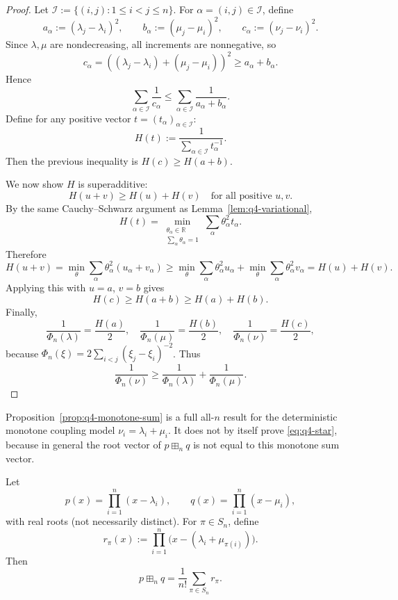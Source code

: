 \begin{proof}
Let $\mathcal I:=\{(i,j):1\le i<j\le n\}$. For $\alpha=(i,j)\in\mathcal I$, define
\[
a_\alpha:=(\lambda_j-\lambda_i)^2,\qquad
b_\alpha:=(\mu_j-\mu_i)^2,\qquad
c_\alpha:=(\nu_j-\nu_i)^2.
\]
Since $\lambda,\mu$ are nondecreasing, all increments are nonnegative, so
\[
c_\alpha=( (\lambda_j-\lambda_i)+(\mu_j-\mu_i) )^2\ge a_\alpha+b_\alpha.
\]
Hence
\[
\sum_{\alpha\in\mathcal I}\frac1{c_\alpha}\le \sum_{\alpha\in\mathcal I}\frac1{a_\alpha+b_\alpha}.
\]
Define for any positive vector $t=(t_\alpha)_{\alpha\in\mathcal I}$:
\[
H(t):=\frac1{\sum_{\alpha\in\mathcal I} t_\alpha^{-1}}.
\]
Then the previous inequality is $H(c)\ge H(a+b)$.

We now show $H$ is superadditive:
\[
H(u+v)\ge H(u)+H(v)\quad\text{for all positive }u,v.
\]
By the same Cauchy--Schwarz argument as Lemma~\ref{lem:q4-variational},
\[
H(t)=\min_{\substack{\theta_\alpha\in\mathbb R\\ \sum_\alpha \theta_\alpha=1}}
\sum_\alpha \theta_\alpha^2 t_\alpha.
\]
Therefore
\[
H(u+v)
=\min_\theta \sum_\alpha \theta_\alpha^2(u_\alpha+v_\alpha)
\ge
\min_\theta \sum_\alpha \theta_\alpha^2u_\alpha
+
\min_\theta \sum_\alpha \theta_\alpha^2v_\alpha
=H(u)+H(v).
\]
Applying this with $u=a$, $v=b$ gives
\[
H(c)\ge H(a+b)\ge H(a)+H(b).
\]
Finally,
\[
\frac1{\Phi_n(\lambda)}=\frac{H(a)}{2},\quad
\frac1{\Phi_n(\mu)}=\frac{H(b)}{2},\quad
\frac1{\Phi_n(\nu)}=\frac{H(c)}{2},
\]
because $\Phi_n(\xi)=2\sum_{i<j}(\xi_j-\xi_i)^{-2}$.
Thus
\[
\frac1{\Phi_n(\nu)}\ge \frac1{\Phi_n(\lambda)}+\frac1{\Phi_n(\mu)}.
\]
\end{proof}

\begin{remark}
Proposition~\ref{prop:q4-monotone-sum} is a full all-$n$ result for the deterministic monotone coupling model
$\nu_i=\lambda_i+\mu_i$.
It does not by itself prove \eqref{eq:q4-star}, because in general the root vector of $p\boxplus_n q$ is not equal to this monotone sum vector.
\end{remark}

\begin{lemma}\label{lem:q4-perm-average}
Let
\[
p(x)=\prod_{i=1}^n (x-\lambda_i),\qquad
q(x)=\prod_{i=1}^n (x-\mu_i),
\]
with real roots (not necessarily distinct). For $\pi\in S_n$, define
\[
r_\pi(x):=\prod_{i=1}^n \bigl(x-(\lambda_i+\mu_{\pi(i)})\bigr).
\]
Then
\[
p\boxplus_n q
=
\frac1{n!}\sum_{\pi\in S_n} r_\pi.
\]
\end{lemma}

